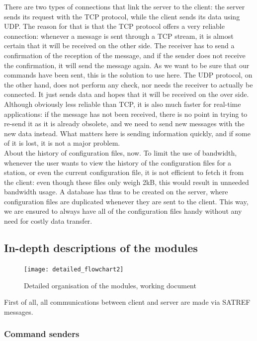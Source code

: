 \documentclass{themeensg}
\begin{document}
There are two types of connections that link the server to the client: the server sends its request with the TCP protocol, while the client sends its data using UDP. The reason for that is that the TCP protocol offers a very reliable connection: whenever a message is sent through a TCP stream, it is almost certain that it will be received on the other side. The receiver has to send a confirmation of the reception of the message, and if the sender does not receive the confirmation, it will send the message again. As we want to be sure that our commands have been sent, this is the solution to use here.
The UDP protocol, on the other hand, does not perform any check, nor needs the receiver to actually be connected. It just sends data and hopes that it will be received on the over side. Although obviously less reliable than TCP, it is also much faster for real-time applications: if the message has not been received, there is no point in trying to re-send it as it is already obsolete, and we need to send new messages with the new data instead. What matters here is sending information quickly, and if some of it is lost, it is not a major problem.\\

About the history of configuration files, now. To limit the use of bandwidth, whenever the user wants to view the history of the configuration files for a station, or even the current configuration file, it is not efficient to fetch it from the client: even though these files only weigh 2kB, this would result in unneeded bandwidth usage.
A database has thus to be created on the server, where configuration files are duplicated whenever they are sent to the client. This way, we are ensured to always have all of the configuration files handy without any need for costly data transfer.


\subsection{In-depth descriptions of the modules}

\begin{figure}[!h]
	\centering
	\texttt{[image: detailed\_flowchart2]}
	\caption{Detailed organisation of the modules, working document}
\end{figure}

First of all, all communications between client and server are made via SATREF messages. 

\subsubsection{Command senders}
\end{document}
